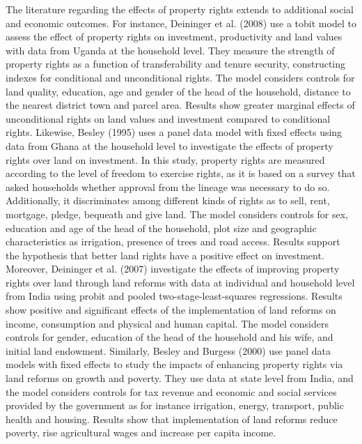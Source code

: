 \documentclass[a4paper, 12pt]{article}
\begin{document}
The literature regarding the effects of property rights extends to additional social and economic outcomes. For instance, Deininger et al. (2008) use a tobit model to assess the effect of property rights on investment, productivity and land values with data from Uganda at the household level. They measure the strength of property rights as a function of transferability and tenure security, constructing indexes for conditional and unconditional rights. The model considers controls for land quality, education, age and gender of the head of the household, distance to the nearest district town and parcel area. Results show greater marginal effects of unconditional rights on land values and investment compared to conditional rights. Likewise, Besley (1995) uses a panel data model with fixed effects using data from Ghana at the household level to investigate the effects of property rights over land on investment. In this study, property rights are measured according to the level of freedom to exercise rights, as it is based on a survey that asked households whether approval from the lineage was necessary to do so. Additionally, it discriminates among different kinds of rights as to sell, rent, mortgage, pledge, bequeath and give land. The model considers controls for sex, education and age of the head of the household, plot size and geographic characteristics as irrigation, presence of trees and road access. Results support the hypothesis that better land rights have a positive effect on investment. Moreover, Deininger et al. (2007) investigate the effects of improving property rights over land through land reforms with data at individual and household level from India using probit and pooled two-stage-least-squares regressions. Results show positive and significant effects of the implementation of land reforms on income, consumption and physical and human capital. The model considers controls for gender, education of the head of the household and his wife, and initial land endowment. Similarly, Besley and Burgess (2000) use panel data models with fixed effects to study the impacts of enhancing property rights via land reforms on growth and poverty. They use data at state level from India, and the model considers controls for tax revenue and economic and social services provided by the government as for instance irrigation, energy, transport, public health and housing. Results show that implementation of land reforms reduce poverty, rise agricultural wages and increase per capita income.
\end{document}
